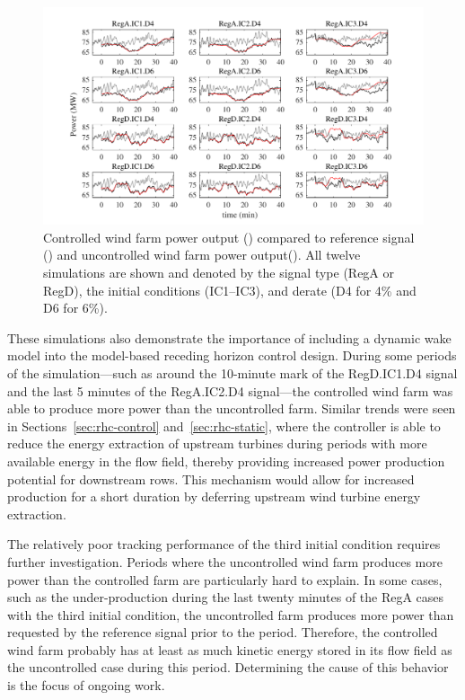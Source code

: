 \begin{figure}[h!]
\centering
\includegraphics[width=\textwidth]{./fig/enkf-rhc.pdf}
\caption{Controlled wind farm power output (\full) compared to reference signal ({\color{red}\full}) and uncontrolled wind farm power output({\color{gray}\full}). All twelve simulations are shown and denoted by the signal type (RegA or RegD), the initial conditions (IC1--IC3), and derate (D4 for 4\% and D6 for 6\%).}
\label{fig:enkf-rhc}
\end{figure}
These simulations also demonstrate the importance of including a dynamic wake model into the model-based receding horizon control design. During some periods of the simulation---such as around the 10-minute mark of the RegD.IC1.D4 signal and the last 5 minutes of the RegA.IC2.D4 signal---the controlled wind farm was able to produce more power than the uncontrolled farm. Similar trends were seen in Sections~\ref{sec:rhc-control} and~\ref{sec:rhc-static}, where the controller is able to reduce the energy extraction of upstream turbines during periods with more available energy in the flow field, thereby providing increased power production potential for downstream rows. This mechanism would allow for increased production for a short duration by deferring upstream wind turbine energy extraction.

The relatively poor tracking performance of the third initial condition requires further investigation. Periods where the uncontrolled wind farm produces more power than the controlled farm are particularly hard to explain. In some cases, such as the under-production during the last twenty minutes of the RegA cases with the third initial condition, the uncontrolled farm produces more power than requested by the reference signal prior to the period. Therefore, the controlled wind farm probably has at least as much kinetic energy stored in its flow field as the uncontrolled case during this period. Determining the cause of this behavior is the focus of ongoing work.

